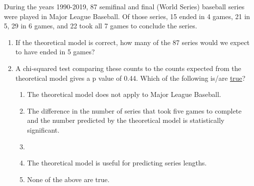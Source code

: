\documentclass[12pt,fullpage]{amsart}
\begin{document}
\begin{enumerate}
  During the years 1990-2019, 87 semifinal and final (World Series) baseball series were played in Major League Baseball. Of those series, 15 ended in 4 games, 21 in 5, 29 in 6 games, and 22 took all 7 games to conclude the series.

  \begin{enumerate}
  \item If the theoretical model is correct, how many of the 87 series would we expect to have ended in 5 games?

    
  \item A chi-squared test comparing these counts to the counts expected from the theoretical model gives a p value of 0.44. Which of the following is/are \underline{true}?
    \begin{enumerate}
    \item The theoretical model does not apply to Major League Baseball.
    \item The difference in the number of series that took five games to complete and the number predicted by the theoretical model is statistically significant.
    \item {}
    \item The theoretical model is useful for predicting series lengths.
    \item None of the above are true.
    \end{enumerate}
  \end{enumerate}

\vfill

\end{enumerate}
\end{document}
